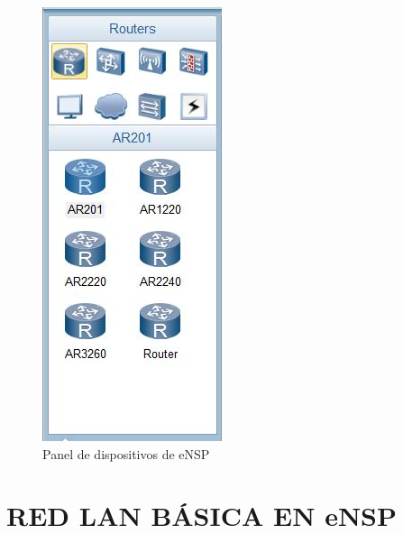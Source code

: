 \documentclass[journal]{IEEEtran}
\begin{document}
\begin{center}
\begin{figure}[H]
\centering
\includegraphics[scale=0.75]{2.JPG} 
\caption{Panel de dispositivos de eNSP}
\end{figure}
\end{center}
\section{RED LAN BÁSICA EN eNSP}
\end{document}
